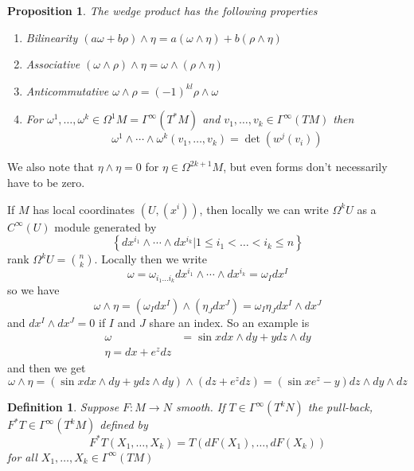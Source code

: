 \documentclass[a4paper]{article}
\newtheorem*{prop}{Proposition}
\newtheorem*{defn}{Definition}
\begin{document}
\begin{prop}
  The wedge product has the following properties
  \begin{enumerate}
    \item Bilinearity $(a \omega + b \rho) \wedge \eta = a(\omega \wedge \eta) + b (\rho \wedge \eta)$
    \item Associative $(\omega \wedge \rho) \wedge \eta = \omega \wedge (\rho \wedge \eta)$
    \item Anticommutative $\omega \wedge \rho = (-1)^{kl} \rho \wedge \omega$
    \item For $\omega^1, \dots, \omega^k \in \Omega^1M = \Gamma^\infty (T^*M)$ and $v_1,\dots,v_k \in \Gamma^\infty(TM)$ then
      \[
        \omega^1 \wedge \cdots \wedge \omega^k(v_1, \dots, v_k) = \det(w^j(v_i))
      \]
  \end{enumerate}
\end{prop}
We also note that $\eta \wedge \eta = 0$ for $\eta \in \Omega^{2k+1}M$, but even forms don't necessarily have to be zero.

If $M$ has local coordinates $(U,(x^i))$, then locally we can write $\Omega^kU$ as a $C^\infty(U)$ module generated by 
\[
  \left\{ dx^{i_1} \wedge \cdots \wedge dx^{i_k} | 1 \leq i_1 < \dots < i_k \leq n\right\}
\]
rank $\Omega^k U = \binom{n}{k}$. Locally then we write
\[
  \omega = \omega_{i_1 \dots i_k} dx^{i_1} \wedge \cdots \wedge dx^{i_k} = \omega_I dx^I
\]
so we have
\[
  \omega \wedge  \eta = (\omega_I dx^I) \wedge (\eta_J dx^J) = \omega_I \eta_J dx^I \wedge dx^J
\]
and $dx^I \wedge dx^J = 0$ if $I$ and $J$ share an index. So an example is
\[
  \begin{aligned}
    \omega &= \sin x dx \wedge dy + y dz \wedge dy \\
    \eta = dx + e^z dz
  \end{aligned}
\]
and then we get
\[
  \omega \wedge \eta = (\sin x dx \wedge dy + y dz \wedge dy) \wedge (dz + e^zdz) = (\sin x e^z - y) dz \wedge dy \wedge dz
\]

\begin{defn}
  Suppose $F: M \rightarrow N$ smooth. If $T \in \Gamma^\infty(T^kN)$ the pull-back, $F^* T \in \Gamma^\infty(T^kM)$ defined by 
  \[
    F^*T(X_1, \dots, X_k) = T(dF(X_1), \dots, dF(X_k))
  \]
  for all $X_1, \dots, X_k \in \Gamma^\infty(TM)$
\end{defn}
\end{document}
